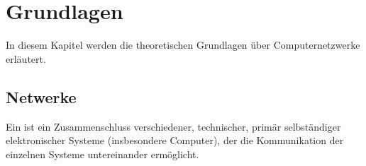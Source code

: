 \chapter{Grundlagen}
\label{basics}
In diesem Kapitel werden die theoretischen Grundlagen über Computernetzwerke erläutert. 
\section{Netwerke}
\begin{Definition}
Ein  ist ein Zusammenschluss verschiedener, technischer, primär selbständiger elektronischer Systeme (insbesondere Computer), der die Kommunikation der einzelnen Systeme untereinander ermöglicht.
\end{Definition}
